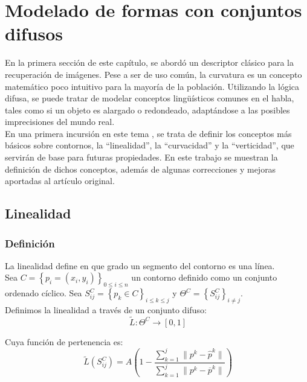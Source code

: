 \section{Modelado de formas con conjuntos difusos}
En la primera sección de este capítulo, se abordó un descriptor clásico para la recuperación de imágenes. Pese a ser de uso común, la curvatura es un concepto matemático poco intuitivo para la mayoría de la población. Utilizando la lógica difusa, se puede tratar de modelar conceptos lingüísticos comunes en el habla, tales como si un objeto es alargado o redondeado, adaptándose a las posibles imprecisiones del mundo real.\\

En una primera incursión en este tema , se trata de definir los conceptos más básicos sobre contornos, la ``linealidad'', la ``curvacidad'' y la ``verticidad'', que servirán de base para futuras propiedades. En este trabajo se muestran la definición de dichos conceptos, además de algunas correcciones y mejoras aportadas al artículo original.\\

\subsection{Linealidad}

\subsubsection{Definición}
La linealidad define en que grado un segmento del contorno es una línea.\\

Sea $ C = \left\lbrace p_i = \left( x_i,y_i\right) \right\rbrace_{0\leq i\leq n}$ un contorno definido como un conjunto ordenado cíclico. Sea $S^C_{ij} = \left\lbrace p_k \in C \right\rbrace_{i \leq k \leq j}$ y $\Theta^C = \left\lbrace S^C_{ij}\right\rbrace_{i \neq j}$.\\

Definimos la linealidad a través de un conjunto difuso:\\

\[
\ \tilde{L}:\Theta^C \rightarrow \left[ 0,1 \right]
\]

Cuya función de pertenencia es:\\

\[
\ \tilde{L} \left(S^C_{ij}\right) = A \left( 1-\frac{\sum^j_{k=1} \parallel p^k - \widehat{p}^k \parallel}{\sum^j_{k=1} \parallel p^k - \overline{p}^k \parallel} \right)
\]

